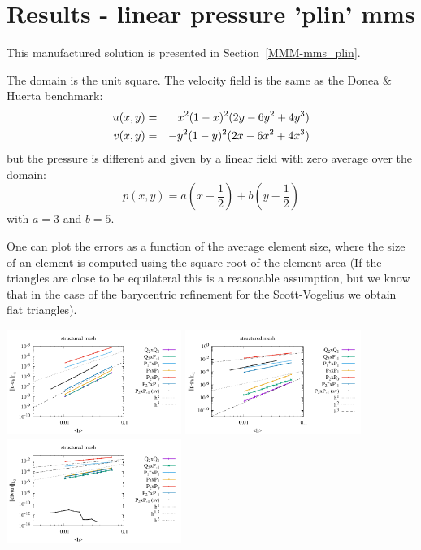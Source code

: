 \newpage
\section*{Results - linear pressure 'plin' mms }

This manufactured solution is presented in Section~\ref{MMM-mms_plin}.

The domain is the unit square.
The velocity field is the same as the Donea \& Huerta benchmark:
\begin{eqnarray}
u(x,y) 
&=& x^2(1- x)^2 (2y - 6y^2 + 4y^3)  \nonumber\\
v(x,y) 
&=& -y^2 (1 - y)^2 (2x - 6x^2 + 4x^3) \nonumber
\end{eqnarray}
but the pressure is different and given by a linear field with zero average 
over the domain:
\[
p(x,y) = a \left(x-\frac12\right) + b\left(y-\frac12 \right)
\]
with $a=3$ and $b=5$.

One can plot the errors as a function of the average element size, where the size of an 
element is computed using the square root of the element area 
(If the triangles are close to be equilateral this is a reasonable
assumption, but we know that in the case of the barycentric refinement for the Scott-Vogelius
we obtain flat triangles).
\begin{center}
\includegraphics[width=5.7cm]{python_codes/fieldstone_120/paperresults/plin_structured_errorsV.pdf}
\includegraphics[width=5.7cm]{python_codes/fieldstone_120/paperresults/plin_structured_errorsP.pdf}
\includegraphics[width=5.7cm]{python_codes/fieldstone_120/paperresults/plin_structured_errors_divv.pdf}\\
\end{center}

